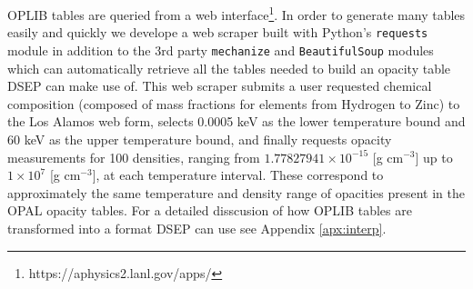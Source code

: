 OPLIB tables are queried from a web
interface\footnote{https://aphysics2.lanl.gov/apps/}. In order to generate many
tables easily and quickly we develope a web scraper built with Python's
\texttt{requests} module in addition to the 3rd party \texttt{mechanize} and
\texttt{BeautifulSoup} modules \citep{chandra2015python,
richardson2007beautiful} which can automatically retrieve all the tables needed
to build an opacity table DSEP can make use of. This web scraper submits a user
requested chemical composition (composed of mass fractions for elements from
Hydrogen to Zinc) to the Los Alamos web form, selects 0.0005 keV as the lower
temperature bound and 60 keV as the upper temperature bound, and finally
requests opacity measurements for 100 densities, ranging from $1.77827941\times
10 ^{-15}$ [g cm$^{-3}$] up to $1\times10^{7}$ [g cm$^{-3}$], at each
temperature interval. These correspond to approximately the same temperature
and density range of opacities present in the OPAL opacity tables. For a
detailed disscusion of how OPLIB tables are transformed into a format DSEP can
use see Appendix \ref{apx:interp}.

